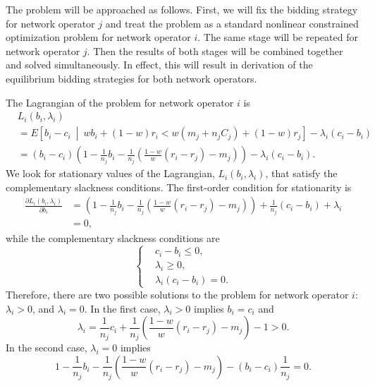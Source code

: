 The problem will be approached as follows. First, we will fix the bidding strategy for network operator $j$ and treat the problem as a standard nonlinear constrained optimization problem for network operator $i$. The same stage will be repeated for network operator $j$. Then the results of both stages will be combined together and solved simultaneously. In effect, this will result in derivation of the equilibrium bidding strategies for both network operators.

The Lagrangian of the problem for network operator $i$ is
\begin{align}
	&L_i(b_i,\lambda_i) \nonumber\\
	&= E \left[ b_i-c_i \:\middle\vert\: wb_i + (1-w)r_i < w(m_j + n_j C_j) + (1-w)r_j\right] - \lambda_i(c_i-b_i) \nonumber\\
	&= (b_i-c_i)\left(1-\frac{1}{n_j}b_i - \frac{1}{n_j}\left(\frac{1-w}{w}(r_i-r_j)-m_j\right)\right) - \lambda_i(c_i-b_i).
	\label{eq:pcomp_langrangean_bidder_i_direct}
\end{align}
We look for stationary values of the Lagrangian, $L_i(b_i,\lambda_i)$, that satisfy the complementary slackness conditions. The first-order condition for stationarity is
\begin{align*}
	\frac{\partial L_i(b_i,\lambda_i)}{\partial b_i} &= \left( 1 - \frac{1}{n_j}b_i - \frac{1}{n_j}\left( \frac{1-w}{w}(r_i-r_j)-m_j \right) \right) + \frac{1}{n_j}\left(c_i-b_i\right) + \lambda_i\nonumber\\
	&=0,
\end{align*}
while the complementary slackness conditions are
\begin{equation*}
	\left\{
	\begin{array}{ll}
		&c_i-b_i\le 0,\\
		&\lambda_i\ge 0,\\
		&\lambda_i(c_i-b_i) = 0.
	\end{array}
	\right.
\end{equation*}
Therefore, there are two possible solutions to the problem for network operator $i$: $\lambda_i > 0$, and $\lambda_i=0$. In the first case, $\lambda_i > 0$ implies $b_i = c_i$ and
\begin{equation*}
	\lambda_i = \frac{1}{n_j}c_i + \frac{1}{n_j}\left( \frac{1-w}{w}(r_i-r_j) - m_j \right) - 1 > 0.
\end{equation*}
In the second case, $\lambda_i = 0$ implies
\begin{equation*}
	1 - \frac{1}{n_j}b_i - \frac{1}{n_j}\left( \frac{1-w}{w}(r_i-r_j) - m_j \right) - (b_i-c_i)\frac{1}{n_j} = 0.
\end{equation*}

